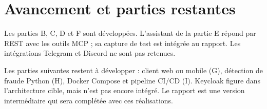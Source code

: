 \documentclass[11pt,a4paper]{report}
\begin{document}
\chapter{Avancement et parties restantes}

Les parties B, C, D et F sont développées. L'assistant de la partie E répond par REST avec les outils MCP ; sa capture de test est intégrée au rapport. Les intégrations Telegram et Discord ne sont pas retenues.

Les parties suivantes restent à développer : client web ou mobile (G), détection de fraude Python (H), Docker Compose et pipeline CI/CD (I). Keycloak figure dans l'architecture cible, mais n'est pas encore intégré. Le rapport est une version intermédiaire qui sera complétée avec ces réalisations.
\end{document}
